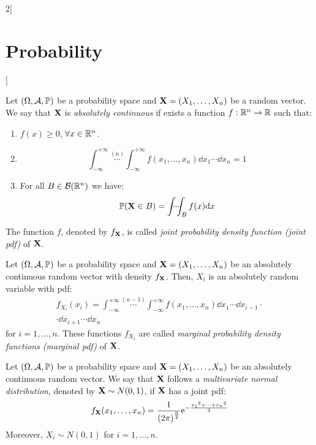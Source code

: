 \documentclass[../../../main.tex]{subfiles}
\begin{document}
\begin{multicols}{2}[\section{Probability}]
\begin{definition}
    \end{definition}
    \begin{definition}
        Let $(\Omega,\mathcal{A},\mathbb{P})$ be a probability space and $\boldsymbol{\mathrm{X}}=(X_1,\ldots,X_n)$ be a random vector. We say that $\boldsymbol{\mathrm{X}}$ is \textit{absolutely continuous} if exists a function $f:\mathbb{R}^n\rightarrow\mathbb{R}$ such that:
        \begin{enumerate}
            \item $f(x)\geq 0$, $\forall x\in\mathbb{R}^n$.
            \item \hfill $$\int_{-\infty}^{+\infty}\overset{(n)}{\cdots}\int_{-\infty}^{+\infty} f(x_1,\ldots,x_n)\dd x_1\cdots\dd x_n=1$$
            \item For all $B\in\mathcal{B}(\mathbb{R}^n)$ we have: $$\Prob(\vf{X}\in B)=\dotsint_Bf(x)\dd x$$
        \end{enumerate}
        The function $f$, denoted by $f_{\boldsymbol{\mathrm{X}}}$, is called \textit{joint probability density function (joint pdf)} of $\boldsymbol{\mathrm{X}}$.
    \end{definition}
    \begin{prop}
        Let $(\Omega,\mathcal{A},\mathbb{P})$ be a probability space and $\boldsymbol{\mathrm{X}}=(X_1,\ldots,X_n)$ be an absolutely continuous random vector with density $f_{\boldsymbol{\mathrm{X}}}$. Then, $X_i$ is an absolutely random variable with pdf:
        \begin{multline*}
            f_{X_i}(x_i)=\int_{-\infty}^{+\infty}\overset{(n-1)}{\cdots}\int_{-\infty}^{+\infty} f(x_1,\ldots,x_n)\dd x_1\cdots\dd x_{i-1}\cdot\\\cdot\dd x_{i+1}\cdots\dd x_n
        \end{multline*}
        for $i=1,\ldots, n$. These functions $f_{X_i}$ are called \textit{marginal probability density functions (marginal pdf)} of $\boldsymbol{\mathrm{X}}$.
    \end{prop}
    \begin{definition}
        Let $(\Omega,\mathcal{A},\mathbb{P})$ be a probability space and $\boldsymbol{\mathrm{X}}=(X_1,\ldots,X_n)$ be an absolutely continuous random vector. We say that $\boldsymbol{\mathrm{X}}$ follows a \textit{multivariate normal distribution}, denoted by $\boldsymbol{\mathrm{X}}\sim N(0,1)$, if $\boldsymbol{\mathrm{X}}$ has a joint pdf: $$f_{\boldsymbol{\mathrm{X}}}(x_1,\ldots,x_n)=\frac{1}{{(2\pi)}^{\frac{n}{2}}}\mathrm{e}^{-\frac{{x_1}^2+\cdots+{x_n}^2}{2}}$$ Moreover, $X_i\sim N(0,1)$ for $i=1,\ldots,n$.
    \end{definition}
    \begin{definition}

\end{definition}
\end{multicols}
\end{document}
